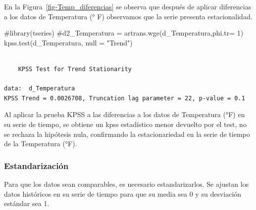 \documentclass[
  us-letterpaper,
]{scrreprt}
\newenvironment{Shaded}{\begin{snugshade}}{\end{snugshade}}
\newcommand{\AttributeTok}[1]{\textcolor[rgb]{0.40,0.45,0.13}{#1}}
\newcommand{\CommentTok}[1]{\textcolor[rgb]{0.37,0.37,0.37}{#1}}
\newcommand{\FunctionTok}[1]{\textcolor[rgb]{0.28,0.35,0.67}{#1}}
\newcommand{\NormalTok}[1]{\textcolor[rgb]{0.00,0.23,0.31}{#1}}
\newcommand{\StringTok}[1]{\textcolor[rgb]{0.13,0.47,0.30}{#1}}
\theoremstyle{plain}
\theoremstyle{definition}
\theoremstyle{definition}
\theoremstyle{remark}
\begin{document}
En la Figura~\ref{fig-Temp_diferencias} se observa que después de
aplicar diferencias a los datos de Temperatura (° F) observamos que la
serie presenta estacionalidad.

\begin{Shaded}
\begin{Highlighting}[]
\CommentTok{\#library(tseries)}
\CommentTok{\#d2\_Temperatura = artrans.wge(d\_Temperatura,phi.tr= 1)}
\FunctionTok{kpss.test}\NormalTok{(d\_Temperatura, }\AttributeTok{null =} \StringTok{"Trend"}\NormalTok{)}
\end{Highlighting}
\end{Shaded}

\begin{verbatim}

    KPSS Test for Trend Stationarity

data:  d_Temperatura
KPSS Trend = 0.0026708, Truncation lag parameter = 22, p-value = 0.1
\end{verbatim}

Al aplicar la prueba KPSS a las diferencias a los datos de Temperatura
(°F) en su serie de tiempo, se obtiene un kpss estadístico menor
devuelto por el test, no se rechaza la hipótesis nula, confirmando la
estacionariedad en la serie de tiempo de la Temperatura (°F).

\subsubsection{Estandarización}\label{estandarizaciuxf3n-1}

Para que los datos sean comparables, es necesario estandarizarlos. Se
ajustan los datos históricos en su serie de tiempo para que su media sea
0 y su desviación estándar sea 1.
\end{document}

